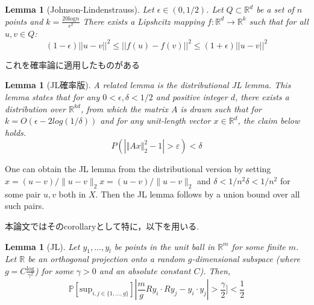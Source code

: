 \documentclass{jarticle}
\newtheorem{lem}[thm]{Lemma}
\begin{document}
\begin{lem}[Johnson-Lindenstrauss]
  Let $ \epsilon \in (0, 1/2)$. Let $Q ⊂ \mathbb{R}^d$ be a set of $n$ points and $k =\frac{20 \mathrm{log}n}{\epsilon^2}$
  There exists a Lipshcitz mapping $f : \mathbb{R}^d \to \mathbb{R}^k$ such that for all $u, v \in Q$:
  \begin{equation*}
    (1 − \epsilon)||u − v||^2 \le ||f(u) − f(v)||^2 \le (1 + \epsilon )||u − v||^2
\end{equation*}
\end{lem}
これを確率論に適用したものがある
\begin{lem}[JL確率版]
A related lemma is the distributional JL lemma. This lemma states that for any
$0 <\epsilon, \delta<1/2$ and positive integer $d$, there exists a distribution over $\mathbb{R}^{kd}$,
from which the matrix $A$ is drawn such that for $k = O(\epsilon−2log(1/\delta))$ and for any unit-length vector $x  \in \mathbb{R}^d$,
the claim below holds.
\begin{equation*}
  {\displaystyle P(|\Vert Ax\Vert _{2}^{2}-1|>\varepsilon )<\delta }
\end{equation*}
\end{lem}
One can obtain the JL lemma from the distributional version by setting
${\displaystyle x=(u-v)/\|u-v\|_{2}} x=(u-v)/\|u-v\|_{2}$ and ${\displaystyle \delta <1/n^{2}} \delta <1/n^{2}$
for some pair $u,v$ both in $X$.
Then the JL lemma follows by a union bound over all such pairs.

本論文ではそのcorollaryとして特に，以下を用いる.
\begin{lem}[JL]
\label{JL}
  Let $y_1,\dots,y_l$ be points in the unit ball in $\mathbb{R}^m$ for some finite $m$.
Let $\mathbb{R}$ be an orthogonal projection onto a random $g$-dimensional subspace
(where $g = C \frac{\mathrm{log}}{\gamma^2}$) for some $\gamma > 0$ and an
absolute constant $C$). Then,
\begin{equation*}
\mathbb{P}[\mathrm{sup}_{i,j \in \{1,\dots,g\}}] | \frac{m}{g}Ry_i\cdot Ry_j -y_i\cdot y_j| > \frac{ \gamma}{2}] < \frac{1}{2}
\end{equation*}
\end{lem}
\end{document}
